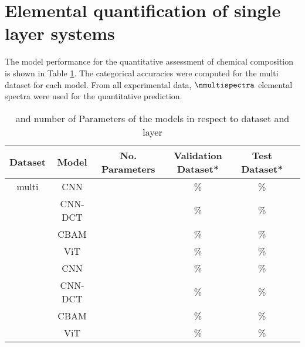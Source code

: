 \section{Elemental quantification of single layer systems}

The model performance for the quantitative assessment of chemical composition is shown in Table \ref{tab:acc_quant}. The categorical accuracies were computed for the multi dataset for each model.
From all experimental data, $\nmultispectra$ elemental spectra were used for the quantitative prediction. 

\begin{table}[H]
    \centering
    \begin{tabular}{c|c|c|c|c|c}
        \hline
       Dataset & Model   & No. Parameters & Validation Dataset*  & Test Dataset*    \\
        \hline
        multi  & CNN     &                &        \%              &         \% \\
               & CNN-DCT &                &       \%              &          \% \\
               & CBAM    &                &       \%              &          \% \\
               & ViT     &                &       \%              &          \% \\
               & CNN     &                &       \%              &          \%  \\
               & CNN-DCT &                &       \%              &          \%  \\
               & CBAM    &                &       \%              &          \% \\
               & ViT     &                &       \%              &          \% \\
    \end{tabular}
    \caption{ and number of Parameters of the models in respect to dataset and layer}
    \label{tab:acc_quant}
\end{table}

